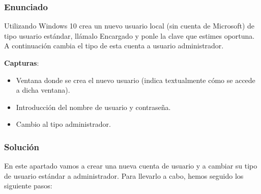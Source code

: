 \subsubsection{Enunciado}

Utilizando Windows 10 crea un nuevo usuario local (sin cuenta de Microsoft) de tipo usuario estándar, llámalo Encargado y ponle la clave que estimes oportuna. A continuación cambia el tipo de esta cuenta a usuario administrador.

\textbf{Capturas}:

\begin{itemize}
    \item Ventana donde se crea el nuevo usuario (indica textualmente cómo se accede a dicha ventana).
    \item Introducción del nombre de usuario y contraseña.
    \item Cambio al tipo administrador.
\end{itemize}

\subsubsection{Solución}

En este apartado vamos a crear una nueva cuenta de usuario y a cambiar su tipo de usuario estándar a administrador. Para llevarlo a cabo, hemos seguido los siguiente pasos:

